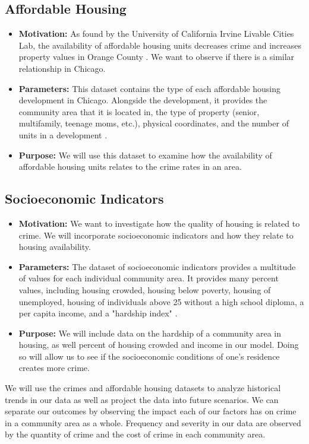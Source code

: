 \documentclass{article}
\begin{document}
\begin{onehalfspacing}
\subsection{Affordable Housing}
\begin{itemize}
    \item \textbf{Motivation:} As found by the University of California Irvine Livable Cities Lab, the availability of affordable housing units decreases crime and increases property values in Orange County \cite{aff-housing-crime-rates}. We want to observe if there is a similar relationship in Chicago.
    \item \textbf{Parameters:} This dataset contains the type of each affordable housing development in Chicago. Alongside the development, it provides the community area that it is located in, the type of property (senior, multifamily, teenage moms, etc.), physical coordinates, and the number of units in a development \cite{housing-developments}.
    \item \textbf{Purpose:} We will use this dataset to examine how the availability of affordable housing units relates to the crime rates in an area.
\end{itemize}

\subsection{Socioeconomic Indicators}
\begin{itemize}
    \item \textbf{Motivation:} We want to investigate how the quality of housing is related to crime. We will incorporate socioeconomic indicators and how they relate to housing availability.
    \item \textbf{Parameters:} The dataset of socioeconomic indicators provides a multitude of values for each individual community area. It provides many percent values, including housing crowded, housing below poverty, housing of unemployed, housing of individuals above 25 without a high school diploma, a per capita income, and a "hardship index" \cite{socioeconomics}.
    \item \textbf{Purpose:} We will include data on the hardship of a community area in housing, as well percent of housing crowded and income in our model. Doing so will allow us to see if the socioeconomic conditions of one's residence creates more crime.
\end{itemize}

We will use the crimes and affordable housing datasets to analyze historical trends in our data as well as project the data into future scenarios. We can separate our outcomes by observing the impact each of our factors has on crime in a community area as a whole. Frequency and severity in our data are observed by the quantity of crime and the cost of crime in each community area.


\end{onehalfspacing}
\end{document}
